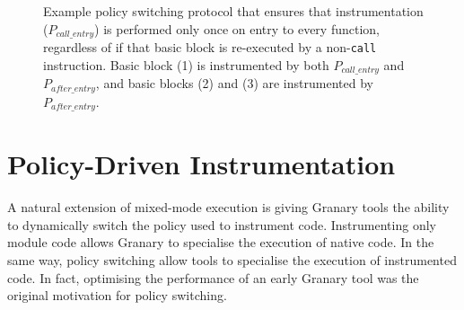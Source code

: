 \documentclass[preprint]{sigplanconf}
\let\ORIGcaption\caption
\begin{document}
\begin{figure*}[ht!]
\vspace{-2em}
\centering
{}
\hfill
\hfill
\ORIGcaption{\label{fig:policy_switching}Example policy switching protocol that ensures that instrumentation ($P_{call\_entry}$) is performed only once on entry to every function, regardless of if that basic block is re-executed by a non-\texttt{call} instruction. Basic block (1) is instrumented by both $P_{call\_entry}$ and $P_{after\_entry}$, and basic blocks (2) and (3) are instrumented by $P_{after\_entry}$.}
\end{figure*}


\section{Policy-Driven Instrumentation}\label{sec:policies}

A natural extension of mixed-mode execution is giving Granary tools the ability to dynamically switch the policy used to instrument code. Instrumenting only module code allows Granary to specialise the execution of native code. In the same way, policy switching allow tools to specialise the execution of instrumented code. In fact, optimising the performance of an early Granary tool was the original motivation for policy switching.
\end{document}
